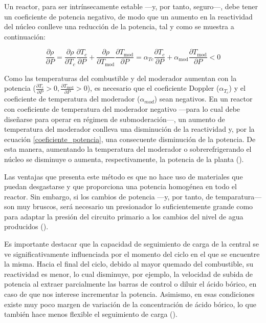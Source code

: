 \begin{itemize}
  Un reactor, para ser intrínsecamente estable ---y, por tanto, seguro---, debe tener un coeficiente de potencia negativo, de modo que un aumento en la \gls{reactividad} del núcleo conlleve una reducción de la potencia, tal y como se muestra a continuación:

  \begin{equation} \label{coeficiente_potencia}
    \frac{\partial \rho}{\partial P}=\frac{\partial \rho}{\partial T_c} \frac{\partial T_c}{\partial P}+\frac{\partial \rho}{\partial T_{\mathrm{mod}}} \frac{\partial T_{\mathrm{mod}}}{\partial P}=\alpha_{T c} \frac{\partial T_c}{\partial P}+\alpha_{\mathrm{mod}} \frac{\partial T_{\mathrm{mod}}}{\partial P}<0
  \end{equation}

  Como las temperaturas del combustible y del moderador aumentan con la potencia ($\frac{\partial T_c}{\partial P}>0, \frac{\partial T_{\mathrm{mod}}}{\partial P}>0$), es necesario que el coeficiente Doppler ($\alpha_{T_{c}}$) y el coeficiente de temperatura del moderador ($\alpha_{mod}$) sean negativos. En un reactor con coeficiente de temperatura del moderador negativo ---para lo cual debe diseñarse para operar en régimen de submoderación---, un aumento de temperatura del moderador conlleva una disminución de la \gls{reactividad} y, por la ecuación \ref{coeficiente_potencia}, una consecuente disminución de la potencia. De esta manera, aumentando la temperatura del moderador o sobrerefrigerando el núcleo se disminuye o aumenta, respectivamente, la potencia de la planta (\cite{apuntes_centrales}).
  
  Las ventajas que presenta este método es que no hace uso de materiales que puedan desgastarse y que proporciona una potencia homogénea en todo el reactor. Sin embargo, si los cambios de potencia ---y, por tanto, de temparatura--- son muy bruscos, será necesario un presionador lo suficientemente grande como para adaptar la presión del circuito primario a los cambios del nivel de agua producidos (\cite{seguimiento_carga_josep_rey}).
\end{itemize}

Es importante destacar que la capacidad de seguimiento de carga de la central se ve significativamente influenciada por el momento del ciclo en el que se encuentre la misma. Hacia el final del ciclo, debido al mayor quemado del combustible, su reactividad es menor, lo cual disminuye, por ejemplo, la velocidad de subida de potencia al extraer parcialmente las barras de control o diluir el ácido bórico, en caso de que nos interese incrementar la potencia. Asimismo, en esas condiciones existe muy poco margen de variación de la concentración de ácido bórico, lo que también hace menos flexible el seguimiento de carga (\cite{apuntes_centrales}).

